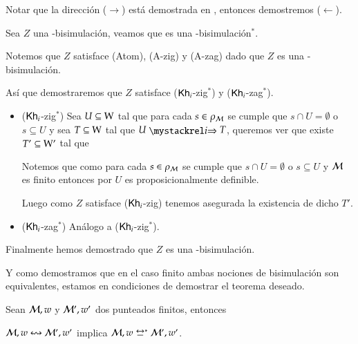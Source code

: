 \begin{demostracion}
    Notar que la dirección ($\rightarrow$) está demostrada en , entonces demostremos ($\leftarrow$).
    
    Sea $Z$ una \KHilogic-bisimulación, veamos que es una \KHilogic-bisimulación$^*$.

    Notemos que $Z$ satisface (Atom), (A-zig) y (A-zag) dado que $Z$ es una \KHilogic-bisimulación.

    Así que demostraremos que $Z$ satisface ($\mathsf{Kh}_i$-zig$^*$) y ($\mathsf{Kh}_i$-zag$^*$).

    \begin{itemize}
        \item ($\mathsf{Kh}_i$-zig$^*$) Sea $U \subseteq \mathrm{W}$ tal que para cada $s \in \rho_{\mathcal{M}}$ se cumple que $s \cap U = \emptyset$ o $s \subseteq U$ 
        y sea $T \subseteq \mathrm{W}$ tal que $U \ultsExecAgi T$, queremos ver que existe $T' \subseteq \mathrm{W}'$ tal que

        \begin{multicols}{2}
        \end{multicols}

        Notemos que como para cada $s \in \rho_{\mathcal{M}}$ se cumple que $s \cap U = \emptyset$ o $s \subseteq U$ y $\mathcal{M}$ es finito entonces 
        por  $U$ es proposicionalmente definible.
    
        Luego como $Z$ satisface ($\mathsf{Kh}_i$-zig) tenemos asegurada la existencia de dicho $T'$.
    
        \item ($\mathsf{Kh}_i$-zag$^*$) Análogo a ($\mathsf{Kh}_i$-zig$^*$). 
    \end{itemize}

    Finalmente hemos demostrado que $Z$ es una \KHilogic-bisimulación.
\end{demostracion}

Y como demostramos que en el caso finito ambas nociones de bisimulación son equivalentes, estamos en condiciones de demostrar el teorema deseado. 

\begin{teorema}
    Sean $\mathcal{M},w$ y $\mathcal{M}',w'$ dos \ultss punteados finitos, entonces
    \begin{center}
        $\mathcal{M},w \mathrel{\leftrightsquigarrow} \mathcal{M}', w'$ implica $\model,w \bisim^* \model', w'$.
    \end{center}
\end{teorema}

